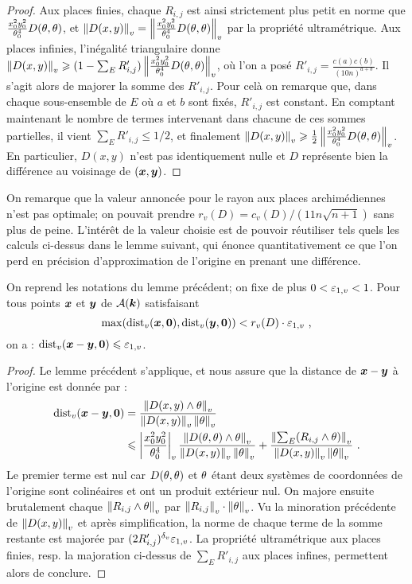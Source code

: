 \begin{proof}
Aux places finies, chaque $R_{i, j}$ est ainsi strictement plus petit en norme que $\frac{x_0^2y_0^2}{\theta_0^4}D(\theta, \theta)$, et $\left\lVert D(x, y)\right\rVert_{v} = \left\lVert\frac{x_0^2y_0^2}{\theta_0^4}D(\theta, \theta)\right\rVert_{v}$ par la propriété ultramétrique. Aux places infinies, l'inégalité triangulaire donne $\left\lVert D(x, y)\right\rVert_{v} \geqslant (1-\sum_E R'_{i, j}) \left\lVert\frac{x_0^2y_0^2}{\theta_0^4}D(\theta, \theta)\right\rVert_{v}$, où l'on a posé $R'_{i, j} = \frac{c(a)c(b)}{ \left( 10n \right)^{a+b}}$. Il s'agit alors de majorer la somme des $R'_{i, j}$. Pour celà on remarque que, dans chaque sous-ensemble de $E$ où $a$ et $b$ sont fixés, $R'_{i, j}$ est constant. En comptant maintenant le nombre de termes intervenant dans chacune de ces sommes partielles, il vient $\sum_E R'_{i, j} \le 1/2$, et finalement $\left\lVert D(x, y)\right\rVert_{v} \geqslant \frac{1}{2} \left\lVert\frac{x_0^2y_0^2}{\theta_0^4}D(\theta, \theta)\right\rVert_{v}$. En particulier, $D(x, y)$ n'est pas identiquement nulle et $D$ représente bien la différence au voisinage de $({\boldsymbol{x}}, {\boldsymbol{y}})$.
\end{proof}

On remarque que la valeur annoncée pour le rayon aux places archimédiennes n'est pas optimale; on pouvait prendre $r_v(D) = c_v(D)/(11n\sqrt{n+1})$ sans plus de peine. L'intérêt de la valeur choisie est de pouvoir réutiliser tels quels les calculs ci-dessus dans le lemme suivant, qui énonce quantitativement ce que l'on perd en précision d'approximation de l'origine en prenant une différence.

\begin{lem} \label{DistRel}
On reprend les notations du lemme précédent; on fixe de plus $0 < \varepsilon_{1, v} < 1$. Pour tous points ${\boldsymbol{x}}$ et ${\boldsymbol{y}}$ de $\mathcal{A}(\boldsymbol{k})$ satisfaisant
\[ \max ( \mathrm{dist}_v({\boldsymbol{x}}, {\boldsymbol{0}}), \mathrm{dist}_v({\boldsymbol{y}}, {\boldsymbol{0}}) ) < r_v(D) \cdot \varepsilon_{1,v} \text{ ,} \]
on a : $\mathrm{dist}_v({\boldsymbol{x}}-{\boldsymbol{y}}, {\boldsymbol{0}}) \leqslant \varepsilon_{1,v}$.
\end{lem}


\begin{proof}
Le lemme précédent s'applique, et nous assure que la distance de ${\boldsymbol{x}}-{\boldsymbol{y}}$ à l'origine  est donnée par :
\begin{align*}
\mathrm{dist}_v({\boldsymbol{x}}-{\boldsymbol{y}}, {\boldsymbol{0}}) & = \frac{\left\lVert D(x, y) \wedge \theta\right\rVert_{v}}{\left\lVert D(x, y)\right\rVert_{v}\left\lVert\theta\right\rVert_{v}} \\
& \leqslant \left\lvert\frac{x_0^2y_0^2}{\theta_0^4}\right\rvert_{v}\frac{\left\lVert D(\theta, \theta)\wedge \theta\right\rVert_{v}}{\left\lVert D(x, y)\right\rVert_{v}\left\lVert\theta\right\rVert_{v}} + \frac{\left\lVert\sum_E (R_{i, j} \wedge \theta)\right\rVert_{v}}{\left\lVert D(x, y)\right\rVert_{v}\left\lVert\theta\right\rVert_{v}} \text{ .}
\end{align*}
Le premier terme est nul car $D(\theta, \theta)$ et $\theta$ étant deux systèmes de coordonnées de l'origine sont colinéaires et ont un produit extérieur nul. On majore ensuite brutalement chaque $\left\lVert R_{i, j} \wedge \theta\right\rVert_{v}$ par $\left\lVert R_{i, j}\right\rVert_{v} \cdot \left\lVert\theta\right\rVert_{v}$. Vu la minoration précédente de $\left\lVert D(x, y)\right\rVert_{v}$ et après simplification, la norme de chaque terme de la somme restante est majorée par $(2R'_{i, j})^{\delta_v} \varepsilon_{1, v}$. La propriété ultramétrique aux places finies, resp. la majoration ci-dessus de $\sum_E R'_{i, j}$ aux places infines, permettent alors de conclure.
\end{proof}


